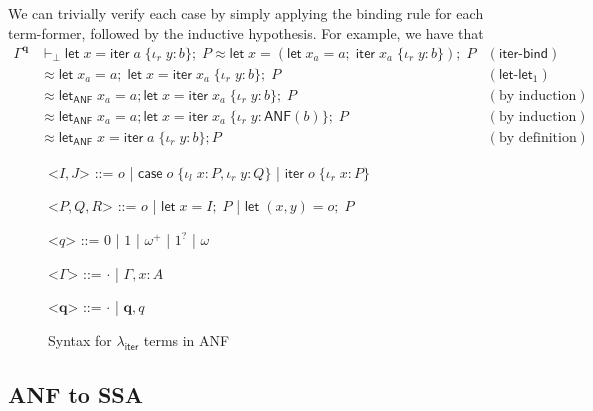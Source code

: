 \documentclass[acmsmall,screen,anonymous,review]{acmart}
\newcommand{\mb}[1]{\ensuremath{\mathbf{#1}}}
\newcommand{\ms}[1]{\ensuremath{\mathsf{#1}}}
\newcommand{\lto}{:}
\newcommand{\linl}[1]{\iota_l\;{#1}}
\newcommand{\linr}[1]{\iota_r\;{#1}}
\newcommand{\letexpr}[3]{\ensuremath{\ms{let}\;#1 = #2;\;#3}}
\newcommand{\caseexpr}[5]{\ms{case}\;#1\;\{\linl{#2} \lto #3, \linr{#4} \lto #5\}}
\newcommand{\liter}[3]{\ms{iter}\;#1\;\{ \linr{#2} \lto #3 \}}
\newcommand{\brle}[1]{{\textsf{#1}}}
\newcommand{\toanf}[1]{\ms{ANF}(#1)}
\newcommand{\anflet}[3]{\ms{let}_{\ms{ANF}}\;#1 = #2; #3}
\newcommand{\subiterexp}{\texorpdfstring{\(\lambda_{\ms{iter}}\)}{lambda-iter}}
\newcommand{\zeroq}{0}
\newcommand{\oneq}{1}
\newcommand{\delq}{1^?}
\newcommand{\cpyq}{\omega^+}
\newcommand{\topq}{\omega}
\begin{document}
We can trivially verify each case by simply applying the binding rule for each term-former, followed
by the inductive hypothesis. For example, we have that
\begin{align*}
  \Gamma^{\mb{q}} & \vdash_\bot
    \letexpr{x}{\liter{a}{y}{b}}{P} \approx \letexpr{x}{(\letexpr{x_a}{a}{\liter{x_a}{y}{b}})}{P} 
      & (\brle{iter-bind}) \\
    &\approx \letexpr{x_a}{a}{\letexpr{x}{\liter{x_a}{y}{b}}{P}}
      & (\brle{let-let$_1$}) \\
    & \approx \anflet{x_a}{a}{\letexpr{x}{\liter{x_a}{y}{b}}{P}} & (\text{by induction}) \\
    & \approx \anflet{x_a}{a}{\letexpr{x}{\liter{x_a}{y}{\toanf{b}}}{P}} & (\text{by induction}) \\
    & \approx \anflet{x}{\liter{a}{y}{b}}{P} & (\text{by definition})
\end{align*}

\begin{figure}
  \begin{grammar}
    <\(I, J\)> ::= 
    \(o\)
    \;|\; \(\caseexpr{o}{x}{P}{y}{Q}\)
    \;|\; \(\liter{o}{x}{P}\)

    <\(P, Q, R\)> ::=
    \(o\)
    \;|\; \(\letexpr{x}{I}{P}\)
    \;|\; \(\letexpr{(x, y)}{o}{P}\)
    
    <\(q\)> ::= \(\zeroq\) | \(\oneq\) | \(\cpyq\) | \(\delq\) | \(\topq\)

    <\(\Gamma\)> ::= \(\cdot\) \;|\; \(\Gamma, x : A\)

    <\(\mb{q}\)> ::= \(\cdot\) \;|\; \(\mb{q}, q\)
  \end{grammar}
  \caption{Syntax for \subiterexp{} terms in ANF} \Description{}
  \label{fig:anf-syntax}
\end{figure}

\subsection{ANF to SSA}
\end{document}
